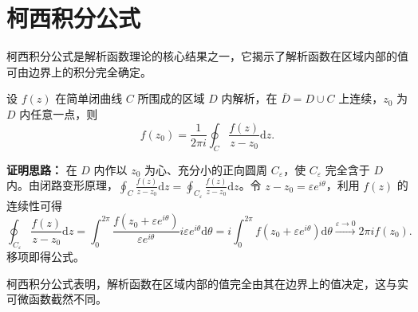 
\section{柯西积分公式}

柯西积分公式是解析函数理论的核心结果之一，它揭示了解析函数在区域内部的值可由边界上的积分完全确定。

\begin{tcolorbox}[title=定理：柯西积分公式, colframe=green!45!black, colback=green!5!white]
	设 $f(z)$ 在简单闭曲线 $C$ 所围成的区域 $D$ 内解析，在 $\overline{D} = D \cup C$ 上连续，$z_0$ 为 $D$ 内任意一点，则
	\[
	f(z_0) = \frac{1}{2\pi i} \oint_C \frac{f(z)}{z - z_0} \mathrm{d}z .
	\]
\end{tcolorbox}

\noindent\textbf{证明思路：} 在 $D$ 内作以 $z_0$ 为心、充分小的正向圆周 $C_\varepsilon$，使 $C_\varepsilon$ 完全含于 $D$ 内。由闭路变形原理，$\oint_C \frac{f(z)}{z-z_0}\mathrm{d}z = \oint_{C_\varepsilon} \frac{f(z)}{z-z_0}\mathrm{d}z$。令 $z - z_0 = \varepsilon e^{i\theta}$，利用 $f(z)$ 的连续性可得
\[
\oint_{C_\varepsilon} \frac{f(z)}{z-z_0}\mathrm{d}z = \int_0^{2\pi} \frac{f(z_0 + \varepsilon e^{i\theta})}{\varepsilon e^{i\theta}} i\varepsilon e^{i\theta}\mathrm{d}\theta = i\int_0^{2\pi} f(z_0 + \varepsilon e^{i\theta})\mathrm{d}\theta \xrightarrow{\varepsilon\to0} 2\pi i f(z_0).
\]
移项即得公式。

\begin{remark}
	柯西积分公式表明，解析函数在区域内部的值完全由其在边界上的值决定，这与实可微函数截然不同。
\end{remark}

